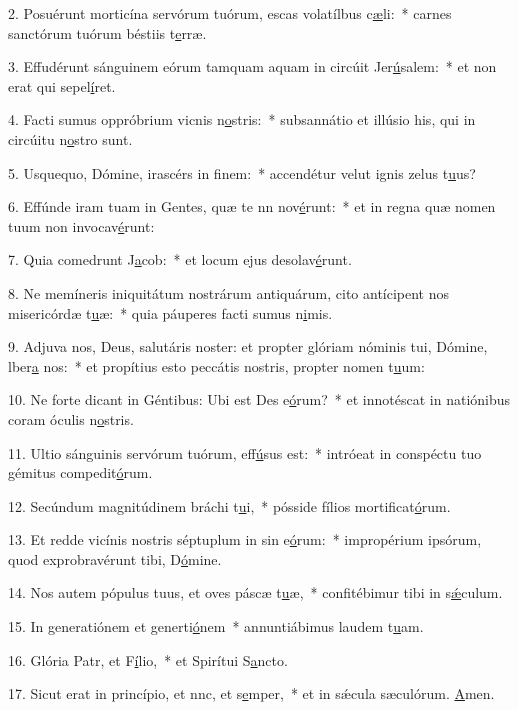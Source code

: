 2. Posuérunt morticína servórum tuórum, escas volatílbus c\uline{æ}li:~* carnes sanctórum tuórum béstiis t\uline{e}rræ.\par 
3. Effudérunt sánguinem eórum tamquam aquam in circúit Jer\uline{ú}salem:~* et non erat qui sepel\uline{í}ret.\par 
4. Facti sumus oppróbrium vicnis n\uline{o}stris:~* subsannátio et illúsio his, qui in circúitu n\uline{o}stro sunt.\par 
5. Usquequo, Dómine, irascérs in f\uline{i}nem:~* accendétur velut ignis zelus t\uline{u}us?\par 
6. Effúnde iram tuam in Gentes, quæ te nn nov\uline{é}runt:~* et in regna quæ nomen tuum non invocav\uline{é}runt:\par 
7. Quia comedrunt J\uline{a}cob:~* et locum ejus desolav\uline{é}runt.\par 
8. Ne memíneris iniquitátum nostrárum antiquárum, cito antícipent nos misericórdæ t\uline{u}æ:~* quia páuperes facti sumus n\uline{i}mis.\par 
9. Adjuva nos, Deus, salutáris noster: et propter glóriam nóminis tui, Dómine, lber\uline{a} nos:~* et propítius esto peccátis nostris, propter nomen t\uline{u}um:\par 
10. Ne forte dicant in Géntibus: Ubi est Des e\uline{ó}rum?~* et innotéscat in natiónibus coram óculis n\uline{o}stris.\par 
11. Ultio sánguinis servórum tuórum,  eff\uline{ú}sus est:~* intróeat in conspéctu tuo gémitus compedit\uline{ó}rum.\par 
12. Secúndum magnitúdinem bráchi t\uline{u}i,~* pósside fílios mortificat\uline{ó}rum.\par 
13. Et redde vicínis nostris séptuplum in sin e\uline{ó}rum:~* impropérium ipsórum, quod exprobravérunt tibi, D\uline{ó}mine.\par 
14. Nos autem pópulus tuus, et oves páscæ t\uline{u}æ,~* confitébimur tibi in s\uline{ǽ}culum.\par 
15. In generatiónem et generti\uline{ó}nem~* annuntiábimus laudem t\uline{u}am.\par 
16. Glória Patr, et F\uline{í}lio,~* et Spirítui S\uline{a}ncto.\par 
17. Sicut erat in princípio, et nnc, et s\uline{e}mper,~* et in sǽcula sæculórum. \uline{A}men.\par 
